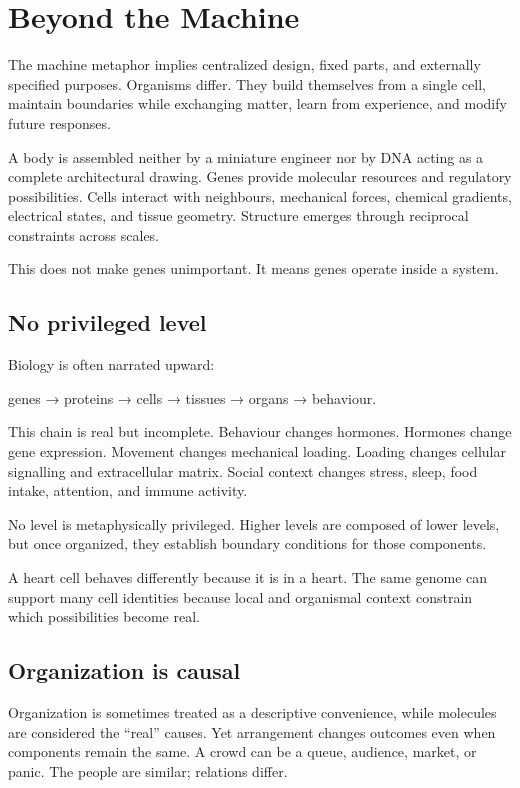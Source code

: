 \chapter{Beyond the Machine}

The machine metaphor implies centralized design, fixed parts, and externally specified purposes. Organisms differ. They build themselves from a single cell, maintain boundaries while exchanging matter, learn from experience, and modify future responses.

A body is assembled neither by a miniature engineer nor by DNA acting as a complete architectural drawing. Genes provide molecular resources and regulatory possibilities. Cells interact with neighbours, mechanical forces, chemical gradients, electrical states, and tissue geometry. Structure emerges through reciprocal constraints across scales.

This does not make genes unimportant. It means genes operate inside a system.

\section{No privileged level}

Biology is often narrated upward:

genes → proteins → cells → tissues → organs → behaviour.

This chain is real but incomplete. Behaviour changes hormones. Hormones change gene expression. Movement changes mechanical loading. Loading changes cellular signalling and extracellular matrix. Social context changes stress, sleep, food intake, attention, and immune activity.

No level is metaphysically privileged. Higher levels are composed of lower levels, but once organized, they establish boundary conditions for those components.

A heart cell behaves differently because it is in a heart. The same genome can support many cell identities because local and organismal context constrain which possibilities become real.

\section{Organization is causal}

Organization is sometimes treated as a descriptive convenience, while molecules are considered the ``real'' causes. Yet arrangement changes outcomes even when components remain the same. A crowd can be a queue, audience, market, or panic. The people are similar; relations differ.


